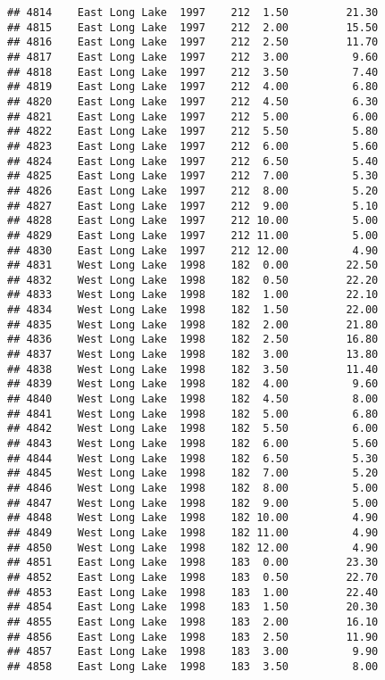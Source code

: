 \documentclass[
]{article}
\begin{document}
\begin{verbatim}
## 4814    East Long Lake  1997    212  1.50         21.30
## 4815    East Long Lake  1997    212  2.00         15.50
## 4816    East Long Lake  1997    212  2.50         11.70
## 4817    East Long Lake  1997    212  3.00          9.60
## 4818    East Long Lake  1997    212  3.50          7.40
## 4819    East Long Lake  1997    212  4.00          6.80
## 4820    East Long Lake  1997    212  4.50          6.30
## 4821    East Long Lake  1997    212  5.00          6.00
## 4822    East Long Lake  1997    212  5.50          5.80
## 4823    East Long Lake  1997    212  6.00          5.60
## 4824    East Long Lake  1997    212  6.50          5.40
## 4825    East Long Lake  1997    212  7.00          5.30
## 4826    East Long Lake  1997    212  8.00          5.20
## 4827    East Long Lake  1997    212  9.00          5.10
## 4828    East Long Lake  1997    212 10.00          5.00
## 4829    East Long Lake  1997    212 11.00          5.00
## 4830    East Long Lake  1997    212 12.00          4.90
## 4831    West Long Lake  1998    182  0.00         22.50
## 4832    West Long Lake  1998    182  0.50         22.20
## 4833    West Long Lake  1998    182  1.00         22.10
## 4834    West Long Lake  1998    182  1.50         22.00
## 4835    West Long Lake  1998    182  2.00         21.80
## 4836    West Long Lake  1998    182  2.50         16.80
## 4837    West Long Lake  1998    182  3.00         13.80
## 4838    West Long Lake  1998    182  3.50         11.40
## 4839    West Long Lake  1998    182  4.00          9.60
## 4840    West Long Lake  1998    182  4.50          8.00
## 4841    West Long Lake  1998    182  5.00          6.80
## 4842    West Long Lake  1998    182  5.50          6.00
## 4843    West Long Lake  1998    182  6.00          5.60
## 4844    West Long Lake  1998    182  6.50          5.30
## 4845    West Long Lake  1998    182  7.00          5.20
## 4846    West Long Lake  1998    182  8.00          5.00
## 4847    West Long Lake  1998    182  9.00          5.00
## 4848    West Long Lake  1998    182 10.00          4.90
## 4849    West Long Lake  1998    182 11.00          4.90
## 4850    West Long Lake  1998    182 12.00          4.90
## 4851    East Long Lake  1998    183  0.00         23.30
## 4852    East Long Lake  1998    183  0.50         22.70
## 4853    East Long Lake  1998    183  1.00         22.40
## 4854    East Long Lake  1998    183  1.50         20.30
## 4855    East Long Lake  1998    183  2.00         16.10
## 4856    East Long Lake  1998    183  2.50         11.90
## 4857    East Long Lake  1998    183  3.00          9.90
## 4858    East Long Lake  1998    183  3.50          8.00

\end{verbatim}
\end{document}
